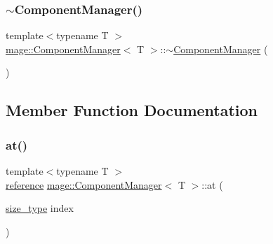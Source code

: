 \subsubsection{\texorpdfstring{$\sim$\+Component\+Manager()}{~ComponentManager()}}
{\footnotesize\ttfamily template$<$typename T $>$ \\
\mbox{\hyperlink{classmage_1_1_component_manager}{mage\+::\+Component\+Manager}}$<$ T $>$\+::$\sim$\mbox{\hyperlink{classmage_1_1_component_manager}{Component\+Manager}} (\begin{DoxyParamCaption}{ }\end{DoxyParamCaption})\hspace{0.3cm}{\ttfamily [default]}}



\subsection{Member Function Documentation}
\mbox{\label{classmage_1_1_component_manager_a79992537bb5e62d6aee7f83860ae49d3}} 
\subsubsection{\texorpdfstring{at()}{at()}\hspace{0.1cm}{\footnotesize\ttfamily [1/2]}}
{\footnotesize\ttfamily template$<$typename T $>$ \\
\mbox{\hyperlink{classmage_1_1_component_manager_a4daeb292f527534c155e359faf7eaf80}{reference}} \mbox{\hyperlink{classmage_1_1_component_manager}{mage\+::\+Component\+Manager}}$<$ T $>$\+::at (\begin{DoxyParamCaption}\item[{\mbox{\hyperlink{classmage_1_1_component_manager_a6bd219525db9ec9f3adb9259e52674da}{size\+\_\+type}}}]{index }\end{DoxyParamCaption})}

\mbox{\label{classmage_1_1_component_manager_adfce9c52a4a63f792d18fda2b101b5a5}} 
